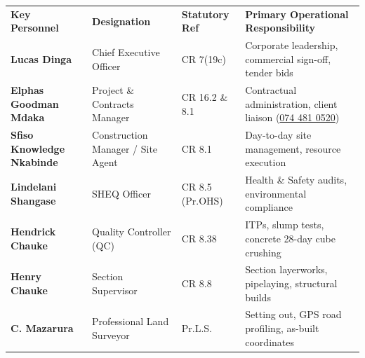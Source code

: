 \documentclass[a4paper,11pt]{article}
\begin{document}
\noindent
\renewcommand{\arraystretch}{1.18}
\begin{tabularx}{\textwidth}{@{}p{3.8cm} p{3.4cm} p{2.2cm} X@{}}
\rowcolor{mhnavy}
{\color{white}\bfseries\fontsize{8pt}{9.8pt}\selectfont Key Personnel} &
{\color{white}\bfseries\fontsize{8pt}{9.8pt}\selectfont Designation} &
{\color{white}\bfseries\fontsize{8pt}{9.8pt}\selectfont Statutory Ref} &
{\color{white}\bfseries\fontsize{8pt}{9.8pt}\selectfont Primary Operational Responsibility} \\
\rowcolor{mhbluelight}
\fontsize{7.6pt}{9.5pt}\selectfont\bfseries Lucas Dinga & \fontsize{7.6pt}{9.5pt}\selectfont Chief Executive Officer & \fontsize{7.6pt}{9.5pt}\selectfont CR 7(19c) & \fontsize{7.6pt}{9.5pt}\selectfont Corporate leadership, commercial sign-off, tender bids \\
\fontsize{7.6pt}{9.5pt}\selectfont\bfseries Elphas Goodman Mdaka & \fontsize{7.6pt}{9.5pt}\selectfont Project \& Contracts Manager & \fontsize{7.6pt}{9.5pt}\selectfont CR 16.2 \& 8.1 & \fontsize{7.6pt}{9.5pt}\selectfont Contractual administration, client liaison (\href{tel:0744810520}{074 481 0520}) \\
\rowcolor{mhbluelight}
\fontsize{7.6pt}{9.5pt}\selectfont\bfseries Sfiso Knowledge Nkabinde & \fontsize{7.6pt}{9.5pt}\selectfont Construction Manager / Site Agent & \fontsize{7.6pt}{9.5pt}\selectfont CR 8.1 & \fontsize{7.6pt}{9.5pt}\selectfont Day-to-day site management, resource execution \\
\fontsize{7.6pt}{9.5pt}\selectfont\bfseries Lindelani Shangase & \fontsize{7.6pt}{9.5pt}\selectfont SHEQ Officer & \fontsize{7.6pt}{9.5pt}\selectfont CR 8.5 (Pr.OHS) & \fontsize{7.6pt}{9.5pt}\selectfont Health \& Safety audits, environmental compliance \\
\rowcolor{mhbluelight}
\fontsize{7.6pt}{9.5pt}\selectfont\bfseries Hendrick Chauke & \fontsize{7.6pt}{9.5pt}\selectfont Quality Controller (QC) & \fontsize{7.6pt}{9.5pt}\selectfont CR 8.38 & \fontsize{7.6pt}{9.5pt}\selectfont ITPs, slump tests, concrete 28-day cube crushing \\
\fontsize{7.6pt}{9.5pt}\selectfont\bfseries Henry Chauke & \fontsize{7.6pt}{9.5pt}\selectfont Section Supervisor & \fontsize{7.6pt}{9.5pt}\selectfont CR 8.8 & \fontsize{7.6pt}{9.5pt}\selectfont Section layerworks, pipelaying, structural builds \\
\rowcolor{mhbluelight}
\fontsize{7.6pt}{9.5pt}\selectfont\bfseries C. Mazarura & \fontsize{7.6pt}{9.5pt}\selectfont Professional Land Surveyor & \fontsize{7.6pt}{9.5pt}\selectfont Pr.L.S. & \fontsize{7.6pt}{9.5pt}\selectfont Setting out, GPS road profiling, as-built coordinates \\
\end{tabularx}
\renewcommand{\arraystretch}{1}
\end{document}
